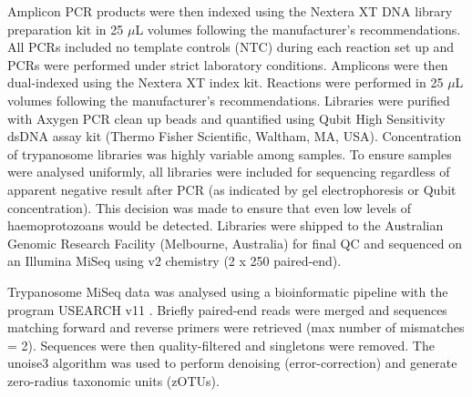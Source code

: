 \documentclass[a4paper, nobind]{templates/ociamthesis}
\begin{document}
Amplicon PCR products were then indexed using the Nextera XT DNA library preparation kit in 25 \(\mu\)L volumes following the manufacturer's recommendations.
All PCRs included no template controls (NTC) during each reaction set up and PCRs were performed under strict laboratory conditions.
Amplicons were then dual-indexed using the Nextera XT index kit.
Reactions were performed in 25 \(\mu\)L volumes following the manufacturer's recommendations.
Libraries were purified with Axygen PCR clean up beads and quantified using Qubit High Sensitivity dsDNA assay kit (Thermo Fisher Scientific, Waltham, MA, USA).
Concentration of trypanosome libraries was highly variable among samples.
To ensure samples were analysed uniformly, all libraries were included for sequencing regardless of apparent negative result after PCR (as indicated by gel electrophoresis or Qubit concentration).
This decision was made to ensure that even low levels of haemoprotozoans would be detected.
Libraries were shipped to the Australian Genomic Research Facility (Melbourne, Australia) for final QC and sequenced on an Illumina MiSeq using v2 chemistry (2 x 250 paired-end).

Trypanosome MiSeq data was analysed using a bioinformatic pipeline with the program USEARCH v11 \autocite{edgarSearchClusteringOrders2010}.
Briefly paired-end reads were merged and sequences matching forward and reverse primers were retrieved (max number of mismatches = 2).
Sequences were then quality-filtered and singletons were removed.
The unoise3 \autocite{edgarUNOISE2ImprovedErrorcorrection2016} algorithm was used to perform denoising (error-correction) and generate zero-radius taxonomic units (zOTUs).
\end{document}
